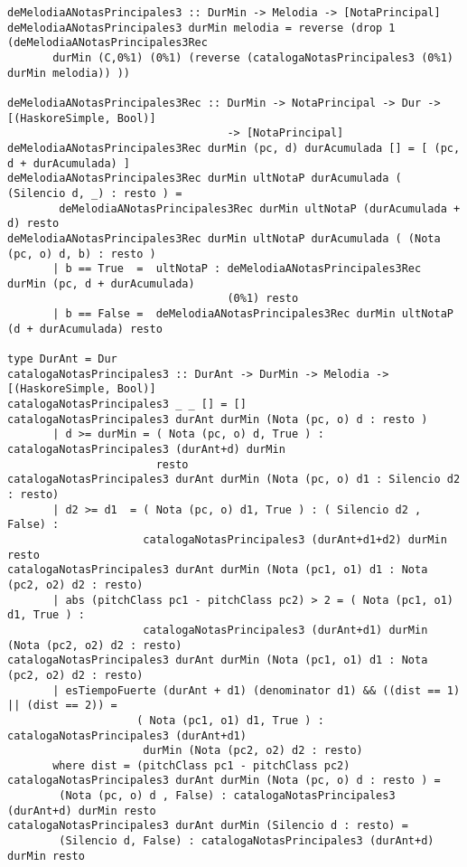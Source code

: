 \begin{verbatim}
deMelodiaANotasPrincipales3 :: DurMin -> Melodia -> [NotaPrincipal]
deMelodiaANotasPrincipales3 durMin melodia = reverse (drop 1 (deMelodiaANotasPrincipales3Rec 
       durMin (C,0%1) (0%1) (reverse (catalogaNotasPrincipales3 (0%1) durMin melodia)) ))

deMelodiaANotasPrincipales3Rec :: DurMin -> NotaPrincipal -> Dur -> [(HaskoreSimple, Bool)] 
                                  -> [NotaPrincipal]
deMelodiaANotasPrincipales3Rec durMin (pc, d) durAcumulada [] = [ (pc, d + durAcumulada) ]
deMelodiaANotasPrincipales3Rec durMin ultNotaP durAcumulada ( (Silencio d, _) : resto ) = 
        deMelodiaANotasPrincipales3Rec durMin ultNotaP (durAcumulada + d) resto
deMelodiaANotasPrincipales3Rec durMin ultNotaP durAcumulada ( (Nota (pc, o) d, b) : resto ) 
       | b == True  =  ultNotaP : deMelodiaANotasPrincipales3Rec durMin (pc, d + durAcumulada) 
                                  (0%1) resto
       | b == False =  deMelodiaANotasPrincipales3Rec durMin ultNotaP (d + durAcumulada) resto

type DurAnt = Dur 
catalogaNotasPrincipales3 :: DurAnt -> DurMin -> Melodia -> [(HaskoreSimple, Bool)]
catalogaNotasPrincipales3 _ _ [] = []
catalogaNotasPrincipales3 durAnt durMin (Nota (pc, o) d : resto )
       | d >= durMin = ( Nota (pc, o) d, True ) : catalogaNotasPrincipales3 (durAnt+d) durMin 
                       resto
catalogaNotasPrincipales3 durAnt durMin (Nota (pc, o) d1 : Silencio d2 : resto) 
       | d2 >= d1  = ( Nota (pc, o) d1, True ) : ( Silencio d2 , False) : 
                     catalogaNotasPrincipales3 (durAnt+d1+d2) durMin resto
catalogaNotasPrincipales3 durAnt durMin (Nota (pc1, o1) d1 : Nota (pc2, o2) d2 : resto)
       | abs (pitchClass pc1 - pitchClass pc2) > 2 = ( Nota (pc1, o1) d1, True ) : 
                     catalogaNotasPrincipales3 (durAnt+d1) durMin (Nota (pc2, o2) d2 : resto)
catalogaNotasPrincipales3 durAnt durMin (Nota (pc1, o1) d1 : Nota (pc2, o2) d2 : resto)
       | esTiempoFuerte (durAnt + d1) (denominator d1) && ((dist == 1) || (dist == 2)) = 
                    ( Nota (pc1, o1) d1, True ) : catalogaNotasPrincipales3 (durAnt+d1) 
                     durMin (Nota (pc2, o2) d2 : resto)
       where dist = (pitchClass pc1 - pitchClass pc2)
catalogaNotasPrincipales3 durAnt durMin (Nota (pc, o) d : resto ) = 
        (Nota (pc, o) d , False) : catalogaNotasPrincipales3 (durAnt+d) durMin resto
catalogaNotasPrincipales3 durAnt durMin (Silencio d : resto) = 
        (Silencio d, False) : catalogaNotasPrincipales3 (durAnt+d) durMin resto
\end{verbatim}

